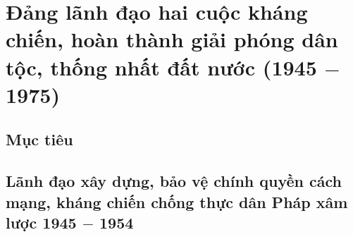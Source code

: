 \chapter{Đảng lãnh đạo hai cuộc kháng chiến, hoàn thành giải phóng dân tộc, thống nhất đất nước (1945 $-$ 1975)}
\section*{Mục tiêu}

\section{Lãnh đạo xây dựng, bảo vệ chính quyền cách mạng, kháng chiến chống thực dân Pháp xâm lược 1945 $-$ 1954}



